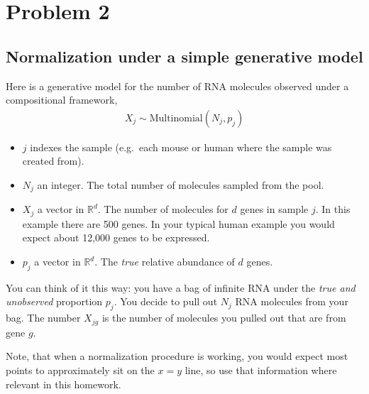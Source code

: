 \section*{Problem 2}
\subsection*{Normalization under a simple generative model}

Here is a generative model for the number of RNA molecules observed under a compositional framework,
\begin{align*}
  X_j \sim \text{Multinomial}(N_j, p_j)
\end{align*}


\begin{itemize}
  \item $j$ indexes the sample (e.g.\ each mouse or human where the sample was created from).
  \item $N_j$ an integer. The total number of molecules sampled from the pool.
  \item $X_j$ a vector in $\mathbb{R}^d$. The number of molecules for $d$ genes in sample $j$. In this example there are 500 genes. In your typical human example you would expect about 12,000 genes to be expressed.
  \item $p_j$ a vector in $\mathbb{R}^d$. The \textit{true} relative abundance of $d$ genes.
\end{itemize}

You can think of it this way: you have a bag of infinite RNA under the \textit{true and unobserved} proportion $p_j$.
You decide to pull out $N_j$ RNA molecules from your bag.
The number $X_{jg}$ is the number of molecules you pulled out that are from gene $g$.

Note, that when a normalization procedure is working, you would expect most points to approximately sit on the $x = y$ line, so use that information where relevant in this homework.

